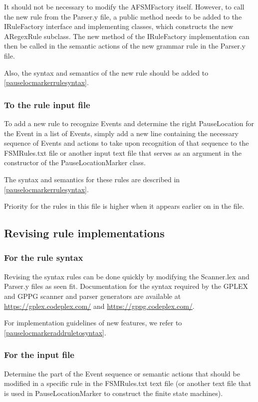 \documentclass[a4paper,11pt]{report}
\begin{document}
			It should not be necessary to modify the AFSMFactory itself. However, to call the new rule from the Parser.y file, a public method needs to be added to the IRuleFactory interface and implementing classes, which constructs the new ARegexRule subclass. The new method of the IRuleFactory implementation can then be called in the semantic actions of the new grammar rule in the Parser.y file.
			
			Also, the syntax and semantics of the new rule should be added to \autoref{pauselocmarkerrulesyntax}.
			
		\subsubsection{To the rule input file}
			To add a new rule to recognize Events and determine the right PauseLocation for the Event in a list of Events, simply add a new line containing the necessary sequence of Events and actions to take upon recognition of that sequence to the FSMRules.txt file or another input text file that serves as an argument in the constructor of the PauseLocationMarker class.
			
			The syntax and semantics for these rules are described in \autoref{pauselocmarkerrulesyntax}.
			
			Priority for the rules in this file is higher when it appears earlier on in the file.
		
		
	\subsection{Revising rule implementations}
		\subsubsection{For the rule syntax}
			Revising the syntax rules can be done quickly by modifying the Scanner.lex and Parser.y files as seen fit. Documentation for the syntax required by the GPLEX and GPPG scanner and parser generators are available at \url{https://gplex.codeplex.com/} and \url{https://gppg.codeplex.com/}.
			
			For implementation guidelines of new features, we refer to \autoref{pauselocmarkeraddruletosyntax}.
			
		\subsubsection{For the input file}
			Determine the part of the Event sequence or semantic actions that should be modified in a specific rule in the FSMRules.txt text file (or another text file that is used in PauseLocationMarker to construct the finite state machines).
			
\end{document}
